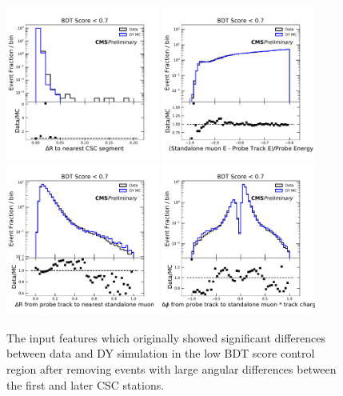 \begin{figure}[htbp]
	\centering
	\includegraphics[width=0.45\textwidth]{figures/partialRegioncscDR.pdf}
	\hspace{0.01\textwidth}
	\includegraphics[width=0.45\textwidth]{figures/partialRegionstandaloneDEoverE.pdf}
	\vspace{0.01\textwidth}
	\includegraphics[width=0.45\textwidth]{figures/partialRegionstaDR.pdf}
	\hspace{0.01\textwidth}
	\includegraphics[width=0.45\textwidth]{figures/partialRegionstaPhi.pdf} 
        \caption[Low-Score Event Validation After Correction]{The input features which originally showed significant differences between data and DY simulation in the low BDT score control region after removing events with large angular differences between the first and later CSC stations.}
	\label{fig:lowScoreInputCorrection}
\end{figure}

